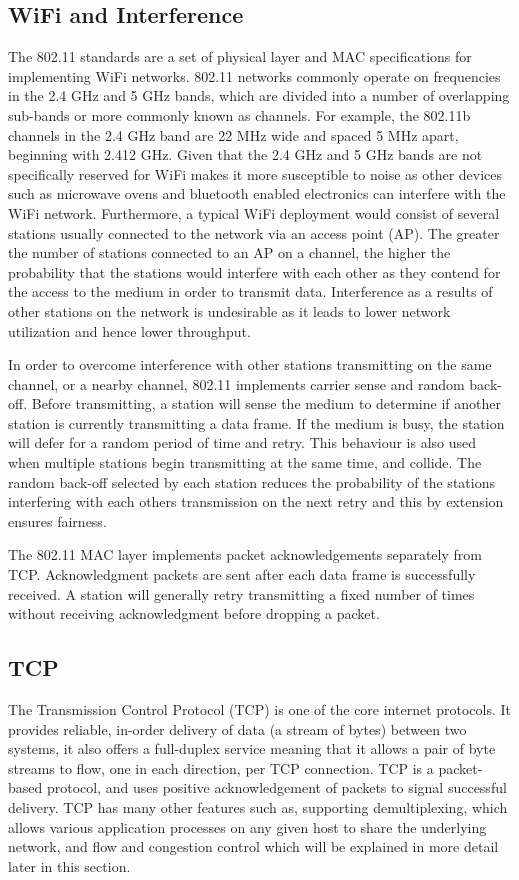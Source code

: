 \subsection{WiFi and Interference}
The 802.11 standards are a set of physical layer and MAC specifications for
implementing WiFi networks.  802.11 networks commonly operate on frequencies in
the 2.4 GHz and 5 GHz bands, which are divided into a number of overlapping
sub-bands or more commonly known as channels. For example, the 802.11b channels
in the 2.4 GHz band are 22 MHz wide and spaced 5 MHz apart, beginning with 2.412
GHz. Given that the 2.4 GHz and 5 GHz bands are not specifically reserved for
WiFi makes it more susceptible to noise as other devices such as microwave ovens
and bluetooth enabled electronics can interfere with the WiFi network.
Furthermore, a typical WiFi deployment would consist of several stations usually
connected to the network via an access point (AP). The greater the number of
stations connected to an AP on a channel, the higher the probability that the
stations would interfere with each other as they contend for the access to the
medium in order to transmit data. Interference as a results of other stations on
the network is undesirable as it leads to lower network utilization and hence
lower throughput.

In order to overcome interference with other stations transmitting on the same
channel, or a nearby channel, 802.11 implements carrier sense and random
back-off. Before transmitting, a station will sense the medium to determine if
another station is currently transmitting a data frame. If the medium is busy,
the station will defer for a random period of time and retry. This behaviour is
also used when multiple stations begin transmitting at the same time, and
collide. The random back-off selected by each station reduces the probability of
the stations interfering with each others transmission on the next retry and
this by extension ensures fairness.

The 802.11 MAC layer implements packet acknowledgements separately from TCP.\@
Acknowledgment packets are sent after each data frame is successfully received.
A station will generally retry transmitting a fixed number of times without
receiving acknowledgment before dropping a packet.

\subsection{TCP}
The Transmission Control Protocol (TCP) is one of the core internet protocols.
It provides reliable, in-order delivery of data (a stream of bytes) between two
systems, it also offers a full-duplex service meaning that it allows a pair of
byte streams to flow, one in each direction, per TCP connection. TCP is a
packet-based protocol, and uses positive acknowledgement of packets to signal
successful delivery. TCP has many other features such as, supporting
demultiplexing, which allows various application processes on any given host to
share the underlying network, and flow and congestion control which will be
explained in more detail later in this section.

